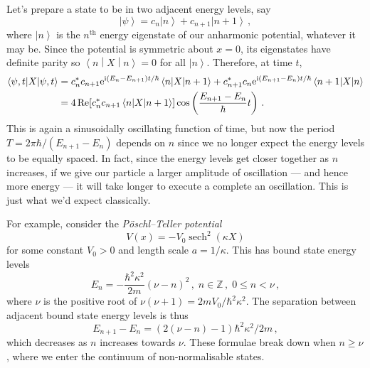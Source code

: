\documentclass{article}
\theoremstyle{plain}\theoremheaderfont{\normalfont\itshape}\theorembodyfont{\rmfamily}\theoremseparator{.}\newtheorem*{rem}{Remark}\newtheorem*{ex}{Example}\newtheorem*{proof}{Proof}\newtheorem*{altp}{Alternative proof}
\theoremstyle{plain}\theoremheaderfont{\normalfont\bfseries}\theorembodyfont{\rmfamily}\theoremseparator{.}\newtheorem{thm}{Theorem}[section]\newtheorem{lem}[thm]{Lemma}\newtheorem{prop}[thm]{Proposition}\newtheorem*{cor}{Corollary}\newtheorem{defn}[thm]{Definition}\newtheorem{clm}[thm]{Claim}\newtheorem{clminproof}{Claim}
\theoremstyle{break}\theoremheaderfont{\normalfont\itshape}\theorembodyfont{\rmfamily}\theoremseparator{.\medskip}\newtheorem*{proofskip}{Proof}\newtheorem*{exs}{Examples}\newtheorem*{rems}{Remarks}
\theoremstyle{break}\theoremheaderfont{\normalfont\bfseries}\theorembodyfont{\rmfamily}\theoremseparator{.\medskip}\newtheorem{lemskip}[thm]{Lemma}\newtheorem{defnskip}[thm]{Definition}\newtheorem{propskip}[thm]{Proposition}\newtheorem{thmskip}[thm]{Theorem}
\numberwithin{equation}{section}
\newcommand{\ii}{\mathrm{i}}
\newcommand{\ee}{\mathrm{e}}
\newcommand{\ket}[1]{\left| #1 \right\rangle}
\newcommand{\mel}[3]{\left\langle #1 \middle| #2 \middle| #3 \right\rangle}
\newcommand{\expval}[2]{\left\langle #2 \middle| #1 \middle| #2 \right\rangle}
\DeclareMathOperator{\sech}{sech}
\renewcommand{\Re}{\operatorname{Re}}
\newcommand{\ZZ}{\mathbb{Z}}
\begin{document}
    Let's prepare a state to be in two adjacent energy levels, say
    \begin{equation}
        \ket{\psi}=c_n\ket{n}+c_{n+1}\ket{n+1}\,,
    \end{equation}
    where \(\ket{n}\) is the \(n^{\text{th}}\) energy eigenstate of our anharmonic potential, whatever it may be. Since the potential is symmetric about \(x=0\), its eigenstates have definite parity so \(\expval{X}{n}=0\) for all \(\ket{n}\). Therefore, at time \(t\),
    \begin{align}
        \expval{X}{\psi,t}&=c_n^*c_{n+1}\ee^{\ii (E_n-E_{n+1})t/\hbar}\mel{n}{X}{n+1}+c_{n+1}^*c_n\ee^{\ii (E_{n+1}-E_n)t/\hbar}\mel{n+1}{X}{n}\notag\\
        &=4\Re[c_n^*c_{n+1}\mel{n}{X}{n+1}]\cos\left(\frac{E_{n+1}-E_n}{\hbar}t\right)\,.
    \end{align}
    This is again a sinusoidally oscillating function of time, but now the period \(T=2\pi\hbar/(E_{n+1}-E_n)\) depends on \(n\) since we no longer expect the energy levels to be equally spaced. In fact, since the energy levels get closer together as \(n\) increases, if we give our particle a larger amplitude of oscillation --- and hence more energy --- it will take longer to execute a complete an oscillation. This is just what we'd expect classically.

    For example, consider the \textit{P\"{o}schl--Teller potential}
    \begin{equation}
        V(x)=-V_0\sech^2(\kappa X)
    \end{equation}
    for some constant \(V_0>0\) and length scale \(a=1/\kappa\). This has bound state energy levels
    \begin{equation}
        E_n=-\frac{\hbar^2\kappa^2}{2m}(\nu-n)^2\,,\;n\in\ZZ\,,\; 0\le n<\nu\,,
    \end{equation}
    where \(\nu\) is the positive root of \(\nu(\nu+1)=2mV_0/\hbar^2\kappa^2\). The separation between adjacent bound state energy levels is thus
    \begin{equation}\label{Poschl_Teller_energy_differences}
        E_{n+1}-E_n=(2(\nu-n)-1)\hbar^2\kappa^2/2m\,,
    \end{equation}
    which decreases as \(n\) increases towards \(\nu\). These formulae break down when \(n\ge\nu\), where we enter the continuum of non-normalisable states.
\end{document}
